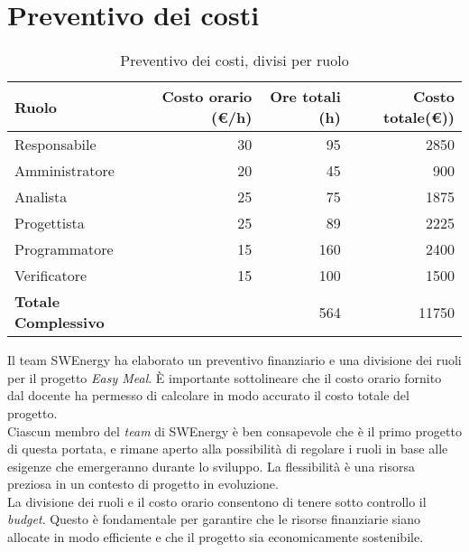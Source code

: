 \section{Preventivo dei costi}

\begin{table}[H]
	\renewcommand{\arraystretch}{1.5}
	\centering
	\begin{tabular}{l|r|r|r}
		\textbf{Ruolo} & \textbf{Costo orario (\euro/h)} & \textbf{Ore totali (h)} & 
		\textbf{Costo totale(\euro))} \\
		\hline
		Responsabile				&	 30 &  95 &	 2850			\\
		Amministratore				&	 20 &  45 &   900  			\\
		Analista					&	 25 &  75 &  1875			\\
		Progettista					&	 25 &  89 &  2225			\\
		Programmatore				&	 15 & 160 &  2400			\\
		Verificatore				&	 15 & 100 &  1500			\\
		\hline
		\textbf{Totale Complessivo} &		& 564 &	11750			\\
	\end{tabular}
	\caption{Preventivo dei costi, divisi per ruolo}

\end{table}

Il team SWEnergy ha elaborato un preventivo finanziario e una divisione dei
ruoli per il progetto \textit{Easy Meal}. È importante 
sottolineare che il costo orario fornito dal docente ha permesso di calcolare 
in modo accurato il costo totale del progetto. \\

\noindent
Ciascun membro del \textit{team} di SWEnergy è ben consapevole che è il primo
progetto di questa portata, e 
rimane aperto alla possibilità di regolare i ruoli in base alle esigenze che 
emergeranno durante lo sviluppo. La flessibilità è una risorsa preziosa in un 
contesto di progetto in evoluzione. \\
La divisione dei ruoli e il costo orario consentono di tenere sotto controllo il
\textit{budget}. Questo è fondamentale per garantire che le risorse finanziarie siano 
allocate in modo efficiente e che il progetto sia economicamente sostenibile.
